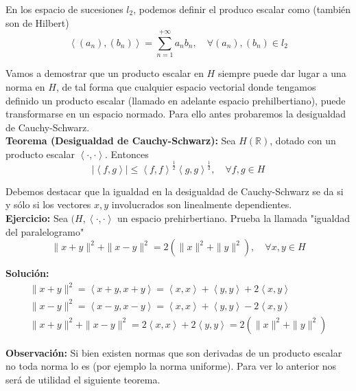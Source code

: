 \documentclass{article}
\begin{document}
En los espacio de sucesiones $l_2$, podemos definir el produco escalar como (también son de Hilbert)
\begin{equation*}
\left\langle (a_n),(b_n)\right\rangle =\sum_{n=1}^{+\infty} a_nb_n,\quad \forall (a_n),(b_n)\in l_2
\end{equation*}

Vamos a demostrar que un producto escalar en $H$ siempre puede dar lugar a una norma en $H$, de tal forma que cualquier espacio vectorial donde tengamos definido un producto escalar (llamado en adelante espacio prehilbertiano), puede transformarse en un espacio normado. Para ello antes probaremos la desigualdad de Cauchy-Schwarz.\\

\textbf{Teorema (Desigualdad de Cauchy-Schwarz):} Sea $H(\mathbb{R})$, dotado con un producto escalar $\left\langle \cdot,\cdot\right\rangle$. Entonces
\begin{equation*}
|\left\langle f,g\right\rangle |\leq \left\langle f,f\right\rangle^{\frac{1}{2}}\left\langle g,g\right\rangle^{\frac{1}{2}},\quad \forall f,g\in H
\end{equation*}

Debemos destacar que la igualdad en la desigualdad de Cauchy-Schwarz se da si y sólo si los vectores $x,y$ involucrados son linealmente dependientes.\\

\textbf{Ejercicio:} Sea $(H,\left\langle \cdot,\cdot \right\rangle$ un espacio prehirbertiano. Prueba la llamada "igualdad del paralelogramo"
\begin{equation*}
\|x+y\|^2+\|x-y\|^2=2(\|x\|^2+\|y\|^2),\quad \forall x,y\in H
\end{equation*}

\textbf{Solución:}
\begin{gather*}
\|x+y\|^2=\left\langle x+y,x+y\right\rangle =\left\langle x,x\right\rangle +\left\langle y,y\right\rangle +2 \left\langle x,y\right\rangle\\
\|x-y\|^2=\left\langle x-y,x-y\right\rangle =\left\langle x,x\right\rangle +\left\langle y,y\right\rangle -2 \left\langle x,y\right\rangle\\
\|x+y\|^2+\|x-y\|^2=2\left\langle x,x\right\rangle +2\left\langle y,y\right\rangle =2(\|x\|^2+\|y\|^2)
\end{gather*}

\textbf{Observación:} Si bien existen normas que son derivadas de un producto escalar no toda norma lo es (por ejemplo la norma uniforme). Para ver lo anterior nos será de utilidad el siguiente teorema.\\
\end{document}

